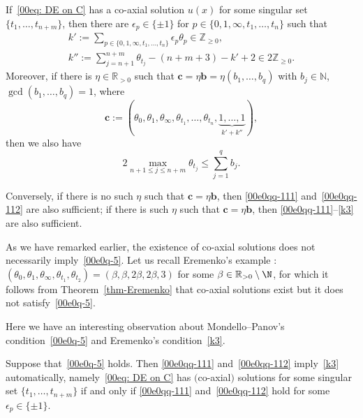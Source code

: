 \begin{Theorem}\label{thm-Eremenko}
If~\eqref{00eq: DE on C} has a co-axial solution $u(x)$ for some singular set $\{t_1,\dots,t_{n+m}\}$, then
 there are $\epsilon_{p}\in\{\pm 1\}$ for $p\in
 \{0,1,\infty,t_1,\dots,t_n\}$ such that
\begin{gather}
k':=\sum_{p\in\{0,1,\infty,t_1,\dots,t_n\}} \epsilon_{p}\theta_{p}\in\mathbb{Z}_{\geq 0},\label{00e0qq-111}
\\
k'':=\sum_{j=n+1}^{n+m} \theta_{t_j}-(n+m+3)-k'+2\in 2\mathbb{Z}_{\geq 0}.\label{00e0qq-112}
\end{gather}
Moreover, if there is $\eta\in\mathbb{R}_{>0}$ such that
$\mathbf{c}=\eta\mathbf{b}=\eta(b_1,\dots,b_q)$ with
$b_j\in\mathbb{N}$, $\gcd(b_1,\dots,b_q)=1$, where
\[
 \boldsymbol c:=(\theta_0,\theta_1,\theta_\infty,\theta_{t_1},
 \dots,\theta_{t_n},\underbrace{1,\dots,1}_{k'+k''}),
\]
then we also have
\begin{equation}\label{k3}
 2\max_{n+1\leq j\leq {n+m}}\theta_{t_j}\leq \sum_{j=1}^q b_j.
\end{equation}



Conversely, if there is no such $\eta$ such that
$\mathbf{c}=\eta\mathbf{b}$, then
\eqref{00e0qq-111} and~\eqref{00e0qq-112} are also sufficient; if there
is such $\eta$ such that $\mathbf{c}=\eta\mathbf{b}$, then
\eqref{00e0qq-111}--\eqref{k3} are also sufficient.
\end{Theorem}

As we have remarked earlier, the existence of co-axial solutions does
not necessarily imply~\eqref{00e0q-5}. Let us recall Eremenko's
example \cite{Coaxial}:
$(\theta_0,\theta_1,\theta_\infty,\theta_{t_1},\theta_{t_2})=(\beta,\beta,2\beta,2\beta,3)$
for some $\beta\in\mathbb{R}_{>0}\setminus\N$, for which it follows
from Theorem~\ref{thm-Eremenko} that co-axial solutions exist but it
does not satisfy~\eqref{00e0q-5}.

Here we have an interesting observation about Mondello--Panov's
condition~\eqref{00e0q-5} and Eremenko's condition~\eqref{k3}.

\begin{Theorem}\label{thm-MP-E}
Suppose that~\eqref{00e0q-5} holds. Then
\eqref{00e0qq-111} and~\eqref{00e0qq-112} imply~\eqref{k3} automatically,
namely~\eqref{00eq: DE on C} has $($co-axial$)$ solutions for some
singular set $\{t_1,\dots,t_{n+m}\}$ if and only if
\eqref{00e0qq-111} and~\eqref{00e0qq-112} hold for some
$\epsilon_p\in\{\pm 1\}$.
\end{Theorem}

